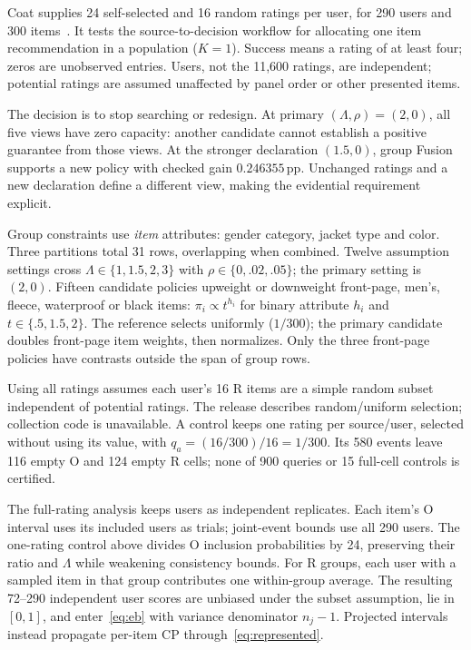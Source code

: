 Coat supplies 24 self-selected and 16 random ratings per user, for 290 users and 300 items~\cite{schnabel2016coat}. It tests the source-to-decision workflow for allocating one item recommendation in a population ($K=1$). Success means a rating of at least four; zeros are unobserved entries. Users, not the 11,600 ratings, are independent; potential ratings are assumed unaffected by panel order or other presented items.

The decision is to stop searching or redesign. At primary $(\Lambda,\rho)=(2,0)$, all five views have zero capacity: another candidate cannot establish a positive guarantee from those views. At the stronger declaration $(1.5,0)$, group Fusion supports a new policy with checked gain $0.246355$\,pp. Unchanged ratings and a new declaration define a different view, making the evidential requirement explicit.

Group constraints use \emph{item} attributes: gender category, jacket type and color. Three partitions total 31 rows, overlapping when combined. Twelve assumption settings cross $\Lambda\in\{1,1.5,2,3\}$ with $\rho\in\{0,.02,.05\}$; the primary setting is $(2,0)$. Fifteen candidate policies upweight or downweight front-page, men's, fleece, waterproof or black items: $\pi_i\propto t^{h_i}$ for binary attribute $h_i$ and $t\in\{.5,1.5,2\}$. The reference selects uniformly ($1/300$); the primary candidate doubles front-page item weights, then normalizes. Only the three front-page policies have contrasts outside the span of group rows.

Using all ratings assumes each user's 16 R items are a simple random subset independent of potential ratings. The release describes random/uniform selection; collection code is unavailable. A control keeps one rating per source/user, selected without using its value, with $q_a=(16/300)/16=1/300$. Its 580 events leave 116 empty O and 124 empty R cells; none of 900 queries or 15 full-cell controls is certified.

The full-rating analysis keeps users as independent replicates. Each item's O interval uses its included users as trials; joint-event bounds use all 290 users. The one-rating control above divides O inclusion probabilities by 24, preserving their ratio and $\Lambda$ while weakening consistency bounds. For R groups, each user with a sampled item in that group contributes one within-group average. The resulting 72--290 independent user scores are unbiased under the subset assumption, lie in $[0,1]$, and enter~\eqref{eq:eb} with variance denominator $n_j-1$. Projected intervals instead propagate per-item CP through~\eqref{eq:represented}.
